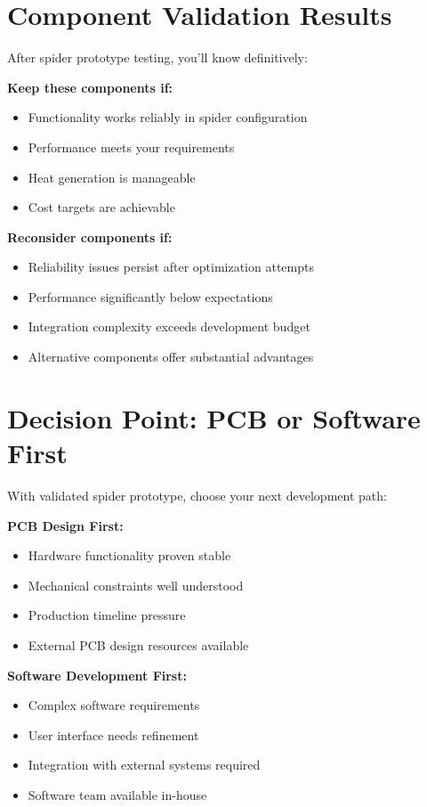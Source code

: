 \section{Component Validation Results}

After spider prototype testing, you'll know definitively:

\textbf{Keep these components if:}
\begin{itemize}
\item Functionality works reliably in spider configuration
\item Performance meets your requirements
\item Heat generation is manageable
\item Cost targets are achievable
\end{itemize}

\textbf{Reconsider components if:}
\begin{itemize}
\item Reliability issues persist after optimization attempts
\item Performance significantly below expectations
\item Integration complexity exceeds development budget
\item Alternative components offer substantial advantages
\end{itemize}

\section{Decision Point: PCB or Software First}

With validated spider prototype, choose your next development path:

\textbf{PCB Design First:}
\begin{itemize}
\item Hardware functionality proven stable
\item Mechanical constraints well understood
\item Production timeline pressure
\item External PCB design resources available
\end{itemize}

\textbf{Software Development First:}
\begin{itemize}
\item Complex software requirements
\item User interface needs refinement
\item Integration with external systems required
\item Software team available in-house
\end{itemize}


